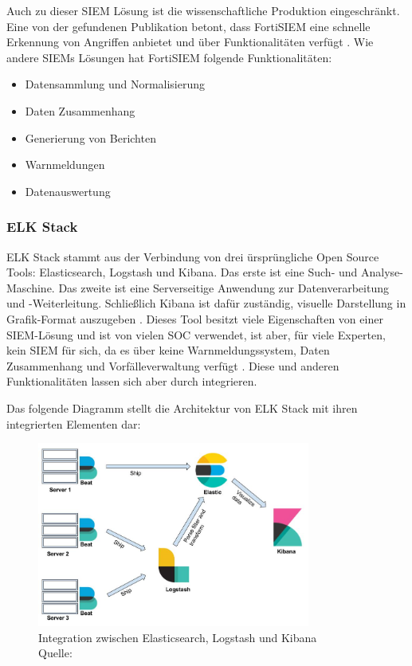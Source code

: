 \newpage
Auch zu dieser \gls{SIEM} Lösung ist die wissenschaftliche Produktion eingeschränkt. Eine von der gefundenen Publikation betont, dass FortiSIEM eine schnelle Erkennung von Angriffen  anbietet und über  Funktionalitäten verfügt \citep{Ramires_fortisiem}. Wie andere \glspl{SIEM} Lösungen hat FortiSIEM folgende Funktionalitäten:

\begin{itemize}[noitemsep]
   \item Datensammlung und Normalisierung
   \item Daten Zusammenhang
   \item Generierung von Berichten
   \item Warnmeldungen
   \item Datenauswertung 
\end{itemize}

\subsubsection{ELK Stack}
ELK Stack stammt aus der Verbindung von drei ürsprüngliche \gls{Open Source} Tools: Elasticsearch, Logstash und Kibana. Das erste ist eine Such- und Analyse-Maschine. Das zweite ist eine Serverseitige Anwendung zur Datenverarbeitung und -Weiterleitung. Schließlich Kibana ist dafür zuständig, visuelle Darstellung in Grafik-Format auszugeben \citep{packt_elkstack}. Dieses Tool besitzt viele Eigenschaften von einer \gls{SIEM}-Lösung und ist von vielen \gls{SOC} verwendet, ist aber, für viele Experten, kein \gls{SIEM} für sich, da es über keine Warnmeldungssystem, Daten Zusammenhang und Vorfälleverwaltung verfügt \citep{Miller_ELK}. Diese und anderen Funktionalitäten lassen sich aber durch  integrieren. 

\newpage
Das folgende Diagramm stellt die Architektur von ELK Stack mit ihren integrierten Elementen  dar:

\begin{figure}[H]
   \centering
   \includegraphics[width=0.8\textwidth]{assets/2_p8.png}
   \caption{Integration zwischen Elasticsearch, Logstash und Kibana\\Quelle: \citep{packt_elkstack} }
   \centering
\end{figure}

